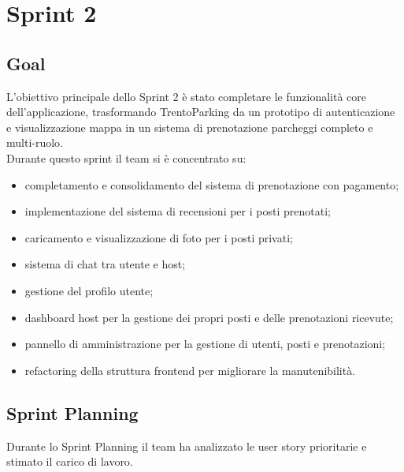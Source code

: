 \documentclass[a4paper,12pt]{article}
\begin{document}
\section{Sprint 2}

\subsection{Goal}

L'obiettivo principale dello Sprint 2 è stato completare le funzionalità core
dell'applicazione, trasformando TrentoParking da un prototipo di autenticazione
e visualizzazione mappa in un sistema di prenotazione parcheggi completo e
multi-ruolo.\\[0.4em]
Durante questo sprint il team si è concentrato su:

\begin{itemize}
  \item completamento e consolidamento del sistema di prenotazione con pagamento;
  \item implementazione del sistema di recensioni per i posti prenotati;
  \item caricamento e visualizzazione di foto per i posti privati;
  \item sistema di chat tra utente e host;
  \item gestione del profilo utente;
  \item dashboard host per la gestione dei propri posti e delle prenotazioni ricevute;
  \item pannello di amministrazione per la gestione di utenti, posti e prenotazioni;
  \item refactoring della struttura frontend per migliorare la manutenibilità.
\end{itemize}

\subsection{Sprint Planning}

Durante lo Sprint Planning il team ha analizzato le user story prioritarie e
stimato il carico di lavoro.
\end{document}
